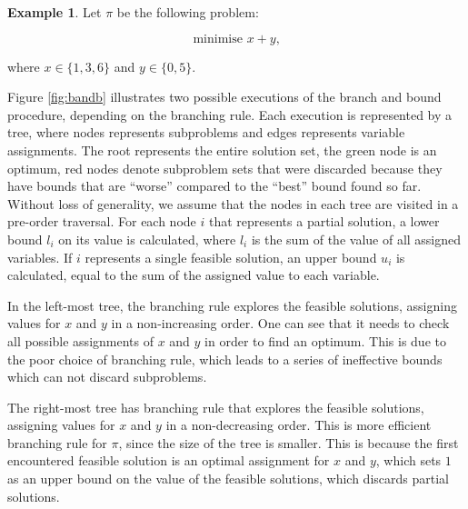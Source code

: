 \documentclass{mprop}
\theoremstyle{definition}
\newtheorem{example}{Example}
\begin{document}
\begin{example}
\label{ex:bandb}
Let $\pi$ be the following problem:

$$ \textrm{minimise } x + y \textrm{,}$$

where $x \in \{1, 3, 6\}$ and $y \in \{0, 5\}$.

Figure \ref{fig:bandb} illustrates two possible executions of the branch and bound procedure, depending on the branching rule. Each execution is represented by a tree, where nodes represents subproblems and edges represents variable assignments. The root represents the entire solution set, the green node is an optimum, red nodes denote subproblem sets that were discarded because they have bounds that are ``worse'' compared to the ``best'' bound found so far. Without loss of generality, we assume that the nodes in each tree are visited in a pre-order traversal. For each node $i$ that represents a partial solution, a lower bound $l_{i}$ on its value is calculated, where $l_{i}$ is the sum of the value of all assigned variables. If $i$ represents a single feasible solution, an upper bound $u_{i}$ is calculated, equal to the sum of the assigned value to each variable.

In the left-most tree, the branching rule explores the feasible solutions, assigning values for $x$ and $y$ in a non-increasing order. One can see that it needs to check all possible assignments of $x$ and $y$ in order to find an optimum. This is due to the poor choice of branching rule, which leads to a series of ineffective bounds which can not discard subproblems.

The right-most tree has branching rule that explores the feasible solutions, assigning values for $x$ and $y$ in a non-decreasing order. This is more efficient branching rule for $\pi$, since the size of the tree is smaller. This is because the first encountered feasible solution is an optimal assignment for $x$ and $y$, which sets $1$ as an upper bound on the value of the feasible solutions, which discards partial solutions.


\end{example}
\end{document}
